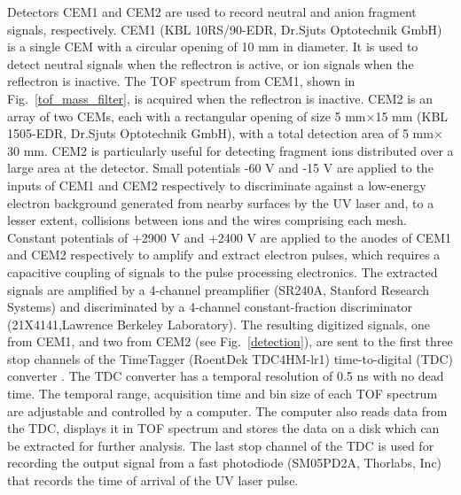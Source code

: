 \documentclass[%
aip,
rsi,
 amsmath,amssymb,
reprint,%
]{revtex4-1}
\begin{document}
Detectors CEM1 and CEM2 are used to record neutral and anion fragment signals, respectively. CEM1 (KBL 10RS/90-EDR, Dr.Sjuts Optotechnik GmbH) is a single CEM with a circular opening of 10 mm in diameter. It is used to detect neutral signals when the reflectron is active, or ion signals when the reflectron is inactive. The TOF spectrum from CEM1, shown in Fig.~\ref{tof_mass_filter}, is acquired when the reflectron is inactive. CEM2 is an array of two CEMs, each with a rectangular opening of size 5 mm$\times$15 mm (KBL 1505-EDR, Dr.Sjuts Optotechnik GmbH), with a total detection area of 5 mm$\times$30 mm. CEM2 is particularly useful for detecting fragment ions distributed over a large area at the detector. Small potentials -60 V and -15 V are applied to the inputs of CEM1 and CEM2 respectively to discriminate against a low-energy electron background generated from nearby surfaces by the UV laser and, to a lesser extent, collisions between ions and the wires comprising each mesh. Constant potentials of +2900 V and +2400 V are applied to the anodes of CEM1 and CEM2 respectively to amplify and extract electron pulses, which requires a capacitive coupling of signals to the pulse processing electronics. The extracted signals are amplified by a 4-channel preamplifier (SR240A, Stanford Research Systems) and discriminated by a 4-channel constant-fraction discriminator (21X4141,Lawrence Berkeley Laboratory). The resulting digitized signals, one from CEM1, and two from CEM2 (see Fig.~\ref{detection}), are sent to the first three stop channels of the TimeTagger (RoentDek TDC4HM-lr1) time-to-digital (TDC) converter . The TDC converter has a temporal resolution of 0.5 ns with no dead time. The temporal range, acquisition time and bin size of each TOF spectrum are adjustable and controlled by a computer. The computer also reads data from the TDC, displays it in TOF spectrum and stores the data on a disk which can be extracted for further analysis. The last stop channel of the TDC is used for recording the output signal from a fast photodiode (SM05PD2A, Thorlabs, Inc) that records the time of arrival of the UV laser pulse. 
\end{document}
